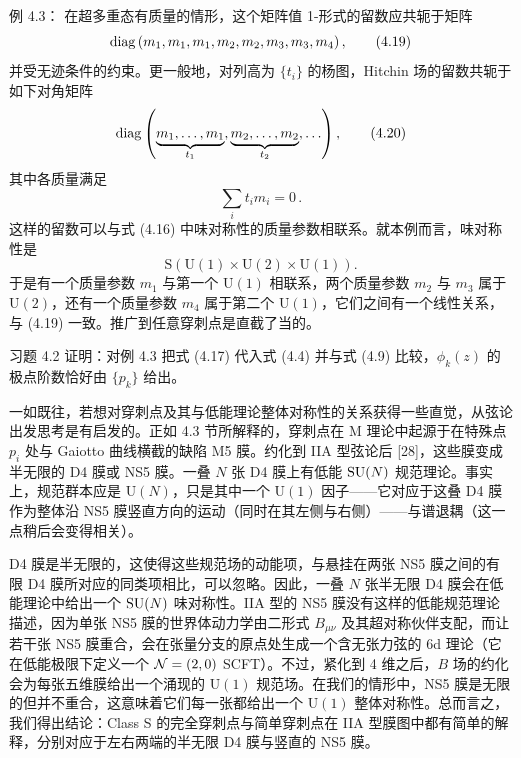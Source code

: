 \begin{examplebox}{例 4.3：}
  在超多重态有质量的情形，这个矩阵值 1-形式的留数应共轭于矩阵
  \begin{equation}
    \operatorname{diag}\left(m_1,m_1,m_1,m_2,m_2,m_3,m_3,m_4\right),
    \tag{4.19}
  \end{equation}
  并受无迹条件的约束。更一般地，对列高为 $\{t_i\}$ 的杨图，Hitchin 场的留数共轭于如下对角矩阵
  \begin{equation}
    \operatorname{diag}\left(\underbrace{m_1,\ldots,m_1}_{t_1},
    \underbrace{m_2,\ldots,m_2}_{t_2},\ldots\right),
    \tag{4.20}
  \end{equation}
  其中各质量满足
  \begin{equation}
    \sum_i t_i m_i = 0\,.
    \tag{4.21}
  \end{equation}
  这样的留数可以与式 (4.16) 中味对称性的质量参数相联系。就本例而言，味对称性是
  \begin{equation}
    \mathrm{S}\left(\mathrm{U}(1)\times\mathrm{U}(2)\times\mathrm{U}(1)\right).
    \tag{4.22}
  \end{equation}
  于是有一个质量参数 $m_1$ 与第一个 $\mathrm{U}(1)$ 相联系，两个质量参数 $m_2$ 与 $m_3$ 属于 $\mathrm{U}(2)$，还有一个质量参数 $m_4$ 属于第二个 $\mathrm{U}(1)$，它们之间有一个线性关系，与 (4.19) 一致。推广到任意穿刺点是直截了当的。
\end{examplebox}


\begin{exercisebox}{习题 4.2}
  证明：对例 4.3 把式 (4.17) 代入式 (4.4) 并与式 (4.9) 比较，$\phi_k(z)$ 的极点阶数恰好由 $\{p_k\}$ 给出。
\end{exercisebox}

一如既往，若想对穿刺点及其与低能理论整体对称性的关系获得一些直觉，从弦论出发思考是有启发的。正如 4.3 节所解释的，穿刺点在 M 理论中起源于在特殊点 $p_i$ 处与 Gaiotto 曲线横截的缺陷 M5 膜。约化到 IIA 型弦论后 [28]，这些膜变成半无限的 D4 膜或 NS5 膜。一叠 $N$ 张 D4 膜上有低能 $\mathrm{SU}(N)$ 规范理论。事实上，规范群本应是 $\mathrm{U}(N)$，只是其中一个 $\mathrm{U}(1)$ 因子——它对应于这叠 D4 膜作为整体沿 NS5 膜竖直方向的运动（同时在其左侧与右侧）——与谱退耦（这一点稍后会变得相关）。

D4 膜是半无限的，这使得这些规范场的动能项，与悬挂在两张 NS5 膜之间的有限 D4 膜所对应的同类项相比，可以忽略。因此，一叠 $N$ 张半无限 D4 膜会在低能理论中给出一个 $\mathrm{SU}(N)$ 味对称性。IIA 型的 NS5 膜没有这样的低能规范理论描述，因为单张 NS5 膜的世界体动力学由二形式 $B_{\mu\nu}$ 及其超对称伙伴支配，而让若干张 NS5 膜重合，会在张量分支的原点处生成一个含无张力弦的 6d 理论（它在低能极限下定义一个 $\mathcal{N}=(2,0)$ SCFT）。不过，紧化到 4 维之后，$B$ 场的约化会为每张五维膜给出一个涌现的 $\mathrm{U}(1)$ 规范场。在我们的情形中，NS5 膜是无限的但并不重合，这意味着它们每一张都给出一个 $\mathrm{U}(1)$ 整体对称性。总而言之，我们得出结论：Class S 的完全穿刺点与简单穿刺点在 IIA 型膜图中都有简单的解释，分别对应于左右两端的半无限 D4 膜与竖直的 NS5 膜。

